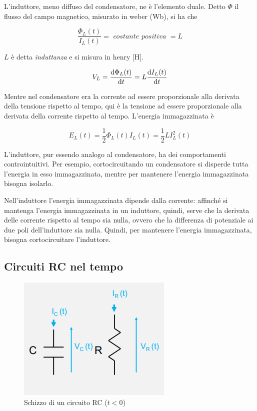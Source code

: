 \documentclass{article}
\begin{document}
L'induttore, meno diffuso del condensatore, ne è l'elemento duale. Detto $\Phi$ il flusso del campo magnetico, misurato in weber (Wb), si ha che 

\[\frac{\Phi _L (t)}{I_L (t)} = \textit{ costante positiva } = L \]

$L$ è detta \textit{induttanza} e si misura in henry [H]. 

\[V_L = \frac{\textrm d \Phi _L (t)}{\textrm d t} = L \frac{\textrm d I _L (t)}{\textrm d t}\]

Mentre nel condensatore era la corrente ad essere proporzionale alla derivata della tensione rispetto al tempo, qui è la tensione ad essere proporzionale alla derivata della corrente rispetto al tempo. L'energia immagazzinata è

\[E_L (t) = \frac{1}{2} \Phi _L (t) I_L (t) = \frac{1}{2} L I_L^2 (t)\]

L'induttore, pur essendo analogo al condensatore, ha dei comportamenti controintuitivi. Per esempio, cortocircuitando un condensatore si disperde tutta l'energia in esso immagazzinata, mentre per mantenere l'energia immagazzinata bisogna isolarlo. 

\vspace{3mm}

Nell'induttore l'energia immagazzinata dipende dalla corrente: affinché si mantenga l'energia immagazzinata in un induttore, quindi, serve che la derivata delle corrente rispetto al tempo sia nulla, ovvero che la differenza di potenziale ai due poli dell'induttore sia nulla. Quindi, per mantenere l'energia immagazzinata, bisogna cortocircuitare l'induttore.









\subsection{Circuiti RC nel tempo}

\begin{figure}[h]
  \centering
  \includegraphics[scale=0.7]{IM_circuito_RC}
  \caption{Schizzo di un circuito RC ($t<0$)}
  \label{Schema_circuito_RC}
\end{figure}
\end{document}
